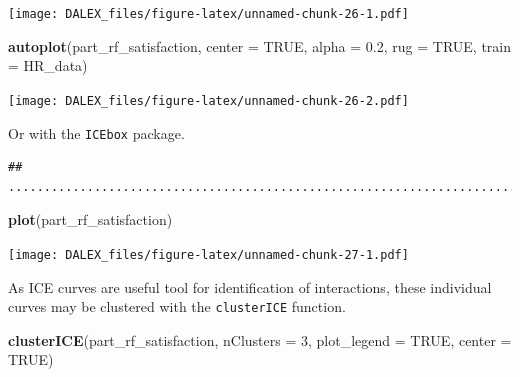 \documentclass[]{book}
\newenvironment{Shaded}{\begin{snugshade}}{\end{snugshade}}
\newcommand{\KeywordTok}[1]{\textcolor[rgb]{0.13,0.29,0.53}{\textbf{#1}}}
\newcommand{\DataTypeTok}[1]{\textcolor[rgb]{0.13,0.29,0.53}{#1}}
\newcommand{\DecValTok}[1]{\textcolor[rgb]{0.00,0.00,0.81}{#1}}
\newcommand{\FloatTok}[1]{\textcolor[rgb]{0.00,0.00,0.81}{#1}}
\newcommand{\StringTok}[1]{\textcolor[rgb]{0.31,0.60,0.02}{#1}}
\newcommand{\OtherTok}[1]{\textcolor[rgb]{0.56,0.35,0.01}{#1}}
\newcommand{\OperatorTok}[1]{\textcolor[rgb]{0.81,0.36,0.00}{\textbf{#1}}}
\newcommand{\NormalTok}[1]{#1}
\theoremstyle{definition}
\theoremstyle{definition}
\theoremstyle{definition}
\theoremstyle{remark}
\begin{document}
\texttt{[image: DALEX\_files/figure-latex/unnamed-chunk-26-1.pdf]}

\begin{Shaded}
\begin{Highlighting}[]
\KeywordTok{autoplot}\NormalTok{(part_rf_satisfaction, }\DataTypeTok{center =} \OtherTok{TRUE}\NormalTok{, }\DataTypeTok{alpha =} \FloatTok{0.2}\NormalTok{, }\DataTypeTok{rug =} \OtherTok{TRUE}\NormalTok{, }\DataTypeTok{train =}\NormalTok{ HR_data)}
\end{Highlighting}
\end{Shaded}

\texttt{[image: DALEX\_files/figure-latex/unnamed-chunk-26-2.pdf]}

Or with the \texttt{ICEbox} package.

\begin{Shaded}
\end{Shaded}

\begin{verbatim}
## ............................................................................................
\end{verbatim}

\begin{Shaded}
\begin{Highlighting}[]
\KeywordTok{plot}\NormalTok{(part_rf_satisfaction)}
\end{Highlighting}
\end{Shaded}

\texttt{[image: DALEX\_files/figure-latex/unnamed-chunk-27-1.pdf]}

As ICE curves are useful tool for identification of interactions, these
individual curves may be clustered with the \texttt{clusterICE}
function.

\begin{Shaded}
\begin{Highlighting}[]
\KeywordTok{clusterICE}\NormalTok{(part_rf_satisfaction, }\DataTypeTok{nClusters =} \DecValTok{3}\NormalTok{, }\DataTypeTok{plot_legend =} \OtherTok{TRUE}\NormalTok{, }\DataTypeTok{center =} \OtherTok{TRUE}\NormalTok{)}
\end{Highlighting}
\end{Shaded}
\end{document}
